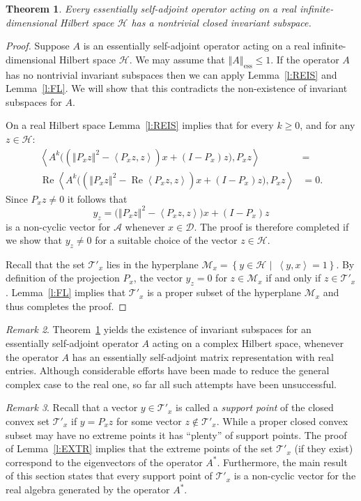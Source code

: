 \documentclass{tran-l}
\newtheorem{thm}{Theorem}[subsection]
\theoremstyle{definition}
\theoremstyle{remark}
\newtheorem{rem}[thm]{Remark}
\numberwithin{equation}{subsection}
\DeclareMathOperator{\RE}{Re}
\DeclareMathOperator{\ess}{ess}
\newcommand{\h}{\mathcal{H}}
\newcommand{\A}{\mathcal{A}}
\newcommand{\M}{\mathcal{M}}
\newcommand{\EssD}{\mathcal{D}}
\newcommand{\States}{\mathcal{T}}
\newcommand{\set}[1]{\left\{#1\right\}}
\newcommand{\seq}[1]{\left<#1\right>}
\newcommand{\norm}[1]{\left\Vert#1\right\Vert}
\newcommand{\essnorm}[1]{\norm{#1}_{\ess}}
\begin{document}
\begin{thm}\label{t:ISR}
Every essentially self-adjoint operator acting on a real infinite-dimensional Hilbert space $\h$ has a nontrivial closed invariant subspace.
\end{thm}

\begin{proof}
Suppose $A$ is an essentially self-adjoint operator acting on a real infinite-dimensional Hilbert space $\h$. We may assume that $\essnorm{A}\leq1$. If the operator $A$ has no nontrivial invariant subspaces then we can apply Lemma~\ref{l:REIS} and Lemma~\ref{l:FL}. We will show that this contradicts the non-existence of invariant subspaces for $A$.

On a real Hilbert space Lemma~\ref{l:REIS} implies that for every $k\geq0$, and for any $z\in\h$:
\begin{align*}
  \seq{A^k\big((\norm{P_x z}^2 - \seq{P_x z,z})x +
    (I-P_x)z\big),P_x z} & = \\
  \RE\seq{A^k\big((\norm{P_x z}^2 - \RE\seq{P_x z,z})x +
    (I-P_x)z\big),P_x z} & = 0 .
\end{align*}
Since $P_x z\neq0$ it follows that
\[  y_z = \big(\norm{P_x z}^2 - \seq{P_x z,z}\big)x + (I-P_x)z \]
is a non-cyclic vector for $\A$ whenever $x\in\EssD$. The proof is therefore completed if we show that $y_z\neq0$ for a suitable choice of the vector $z\in\h$.

Recall that the set $\States'_x$ lies in the hyperplane $\M_x=\set{y\in\h\,\,|\,\,\,\seq{y,x}=1}$. By definition of the projection $P_x$, the vector $y_z=0$ for $z\in\M_x$ if and only if $z\in\States'_x$. Lemma~\ref{l:FL} implies that $\States'_x$ is a proper subset of the hyperplane $\M_x$ and thus completes the proof.
\end{proof}

\begin{rem}
Theorem~\ref{t:ISR} yields the existence of invariant subspaces for an essentially self-adjoint operator $A$ acting on a complex Hilbert space, whenever the operator $A$ has an essentially self-adjoint matrix representation with real entries. Although considerable efforts have been made to reduce the general complex case to the real one, so far all such attempts have been unsuccessful.
\end{rem}

\begin{rem}
Recall that a vector $y\in\States'_x$ is called a \emph{support point} of the closed convex set $\States'_x$ if $y=P_x{z}$ for some vector $z\not\in\States'_x$. While a proper closed convex subset may have no extreme points it has ``plenty'' of support points. The proof of Lemma~\ref{l:EXTR} implies that the extreme points of the set $\States'_x$ (if they exist) correspond to the eigenvectors of the operator $A^*$. Furthermore, the main result of this section states that every support point of $\States'_x$ is a non-cyclic vector for the real algebra generated by the operator $A^*$.
\end{rem}
\end{document}
